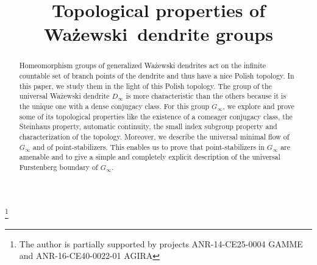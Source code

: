 \documentclass[JEP,XML,SOM,Unicode,NoFloatCountersInSection]{cedram}
\theoremstyle{plain}
\theoremstyle{definition}
\begin{document}
\frontmatter
\title{Topological properties of Wa\.zewski~dendrite groups}

\author[\initial{B.} \lastname{Duchesne}]{ }
\address{Institut Élie Cartan, UMR 7502, Université de Lorraine et CNRS\\
Boulevard des Aiguillettes, B.P. 70239, F-54506 Vandoeuvre-lès-Nancy Cedex, France}

\thanks{The author is partially supported by projects ANR-14-CE25-0004 GAMME and ANR-16-CE40-0022-01 AGIRA}

\begin{abstract}
Homeomorphism groups of generalized Wa\.zewski dendrites act on the infinite countable set of branch points of the dendrite and thus have a nice Polish topology. In this paper, we study them in the light of this Polish topology. The group of the universal Wa\.zewski dendrite $D_\infty$ is more characteristic than the others because it is the unique one with a dense conjugacy class. For this group $G_\infty$, we explore and prove some of its topological properties like the existence of a comeager conjugacy class, the Steinhaus property, automatic continuity, the small index subgroup property and characterization of the topology. Moreover, we describe the universal minimal flow of $G_\infty$ and of point-stabilizers. This enables us to prove that point-stabilizers in $G_\infty$ are amenable and to give a simple and completely explicit description of the universal Furstenberg boundary of $G_\infty$.
\end{abstract}




\end{document}

